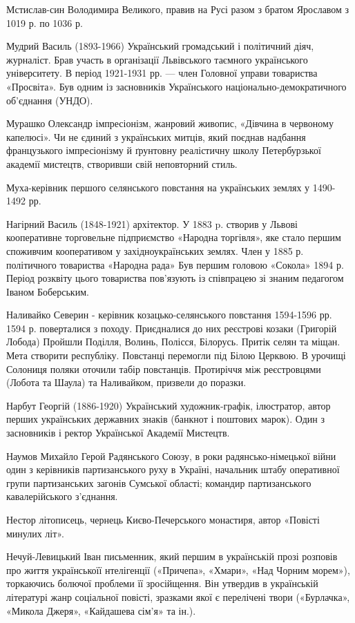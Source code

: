 Мстислав-син Володимира Великого, правив на Русі разом з братом Ярославом з 1019 р. по 1036 р.

Мудрий Василь (1893-1966) Український громадський і політичний діяч, журналіст. Брав участь в організації Львівського таємного українського університету. В період 1921-1931 рр. --- член Головної управи товариства «Просвіта». Був одним із засновників Українського національно-демократичного об’єднання (УНДО).

Мурашко Олександр  імпресіонізм, жанровий живопис, «Дівчина в червоному капелюсі». Чи не єдиний з українських митців, який поєднав надбання французького імпресіонізму й ґрунтовну реалістичну школу Петербурзької академії мистецтв, створивши свій неповторний стиль. 

Муха-керівник першого селянського повстання на українських землях у 1490-1492 рр.

Нагірний Василь (1848-1921) архітектор. У 1883 p. створив у Львові кооперативне торговельне підприємство «Народна торгівля», яке стало першим споживчим кооперативом у західноукраїнських землях. Член у 1885 р. політичного товариства «Народна рада» Був першим головою «Сокола» 1894 р. Період розквіту цього товариства пов’язують із співпрацею зі знаним педагогом Іваном Боберським.

Наливайко Северин  - керівник козацько-селянського повстання 1594-1596 рр. 1594 р. поверталися з походу. Приєдналися до них реєстрові козаки (Григорій Лобода) Пройшли Поділля, Волинь, Полісся, Білорусь. Притік селян та міщан. Мета створити республіку. Повстанці перемогли під Білою Церквою. В урочищі Солониця поляки оточили табір повстанців. Протиріччя між реєстровцями (Лобота та Шаула) та Наливайком, призвели до поразки.

Нарбут Георгій (1886-1920) Український художник-графік, ілюстратор, автор перших українських державних знаків (банкнот і поштових марок). Один з засновників і ректор Української Академії Мистецтв.

Наумов Михайло Герой Радянського Союзу, в роки радянсько-німецької війни один з керівників партизанського руху в Україні, начальник штабу оперативної групи партизанських загонів Сумської області; командир партизанського кавалерійського з'єднання.

Нестор літописець, чернець Києво-Печерського монастиря, автор «Повісті минулих літ».

Нечуй-Левицький Іван письменник, який першим в українській прозі розповів про життя українськоїї нтелігенції («Причепа», «Хмари», «Над Чорним морем»), торкаючись болючої проблеми її зросійщення. Він утвердив в українській літературі жанр соціальної повісті, зразками якої є перелічені твори («Бурлачка», «Микола Джеря», «Кайдашева сім’я» та ін.). 

